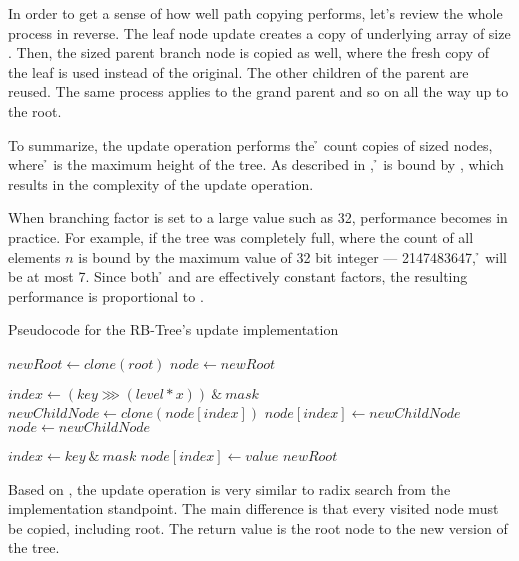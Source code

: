 In order to get a sense of how well path copying performs, let’s review the whole process in reverse. The leaf node update creates a copy of underlying array of size \m{}. Then, the \m{} sized parent branch node is copied as well, where the fresh copy of the leaf is used instead of the original. The other children of the parent are reused. The same process applies to the grand parent and so on all the way up to the root.  

To summarize, the update operation performs the \h{} count copies of \m{} sized nodes, where \h{} is the maximum height of the tree. As described in , \h{} is bound by , which results in the {} complexity of the update operation. 

When branching factor \m{} is set to a large value such as 32, performance becomes  in practice. For example, if the tree was completely full, where the count of all elements $n$ is bound by the maximum value of 32 bit integer —  2147483647, \h{} will be at most 7. Since both \h{} and \m{} are effectively constant factors, the resulting performance is proportional to . 

\begin{listing}[ht!]        
    \caption{Pseudocode for the RB-Tree's update implementation}
    \label{lst:rb-tree-update}
    
    \begin{algorithmic}
            \State $newRoot \leftarrow clone(root)$
            \State $node \leftarrow newRoot$
    
                \State $index \leftarrow (key \ggg (level * x))\ \&\ mask$
                \State $newChildNode \leftarrow clone(node[index])$
                \State $node[index] \leftarrow newChildNode$
                \State $node \leftarrow newChildNode$
            \EndFor
    
            \State $index \leftarrow key\ \&\ mask$
            \State $node[index] \leftarrow value$            
            \State \Return $newRoot$
        \EndFunction
    \end{algorithmic}
\end{listing}

Based on , the update operation is very similar to radix search from the implementation standpoint. The main difference is that every visited node must be copied, including root. The return value is the root node to the new version of the tree. 

